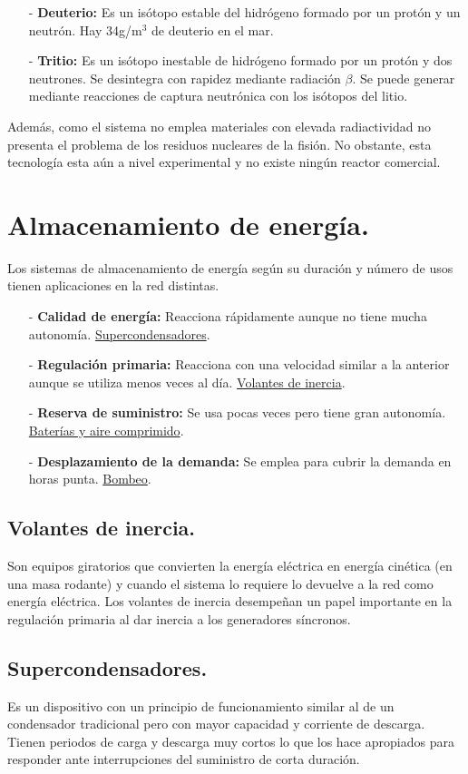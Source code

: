 \begin{itemize}
	\item [-] \textbf{Deuterio:} Es un isótopo estable del hidrógeno formado por un protón y un neutrón. Hay 34g/m$^3$ de deuterio en el mar.
	\item [-]\textbf{Tritio:}  Es un isótopo inestable de hidrógeno formado por un protón y dos neutrones. Se desintegra con rapidez mediante radiación $\beta$. Se puede generar mediante reacciones de captura neutrónica con los isótopos del litio.
\end{itemize} 

Además, como el sistema no emplea materiales con elevada radiactividad no presenta el problema de los residuos nucleares de la fisión. No obstante, esta tecnología esta aún a nivel experimental y no existe ningún reactor comercial.
\section{Almacenamiento de energía.}
Los sistemas de almacenamiento de energía según su duración y número de usos tienen aplicaciones en la red distintas.
\begin{itemize}
	\item [-] \textbf{Calidad de energía:} Reacciona rápidamente aunque no tiene mucha autonomía. \underline{Supercondensadores}.
	\item [-] \textbf{Regulación primaria:} Reacciona con una velocidad similar a la anterior aunque se utiliza menos veces al día. \underline{Volantes de inercia}. 
	\item [-] \textbf{Reserva de suministro:} Se usa pocas veces pero tiene gran autonomía. \underline{Baterías y aire comprimido}.
	\item [-] \textbf{Desplazamiento de la demanda:} Se emplea para cubrir la demanda en horas punta. \underline{Bombeo}.
\end{itemize}

\subsection{Volantes de inercia.}
Son equipos giratorios que convierten la energía eléctrica en energía cinética (en una masa rodante) y cuando el sistema lo requiere lo devuelve a la red como energía eléctrica. Los volantes de inercia desempeñan un papel importante en la regulación primaria al dar inercia a los generadores síncronos.
\subsection{Supercondensadores.}
Es un dispositivo con un principio de funcionamiento similar al de un condensador tradicional pero con mayor capacidad y corriente de descarga. Tienen periodos de carga y descarga muy cortos lo que los hace apropiados para responder ante interrupciones del suministro de corta duración.
